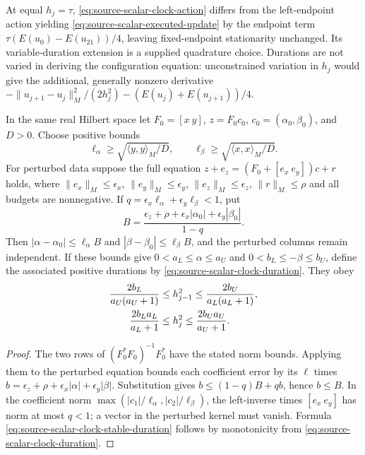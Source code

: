 At equal $h_j=\tau$, \eqref{eq:source-scalar-clock-action} differs from
the left-endpoint action yielding \eqref{eq:source-scalar-executed-update}
by the endpoint term
$\tau(E(u_0)-E(u_{21}))/4$, leaving fixed-endpoint stationarity unchanged.
Its variable-duration extension is a supplied quadrature choice. Durations
are not varied in deriving the configuration equation: unconstrained
variation in $h_j$ would give the additional, generally nonzero derivative
$-\|u_{j+1}-u_j\|_M^2/(2h_j^2)-(E(u_j)+E(u_{j+1}))/4$.

\begin{proposition}
\label{prop:source-scalar-clock-stability}
In the same real Hilbert space let $F_0=[x\ y]$, $z=F_0c_0$,
$c_0=(\alpha_0,\beta_0)$, and $D>0$. Choose positive bounds
\[
 \ell_\alpha\ge\sqrt{\langle y,y\rangle_M/D},\qquad
 \ell_\beta\ge\sqrt{\langle x,x\rangle_M/D}.
\]
For perturbed data suppose the full equation
$z+e_z=(F_0+[e_x\ e_y])c+r$ holds, where
$\|e_x\|_M\le\epsilon_x$, $\|e_y\|_M\le\epsilon_y$,
$\|e_z\|_M\le\epsilon_z$, $\|r\|_M\le\rho$ and all budgets are
nonnegative. If $q=\epsilon_x\ell_\alpha+\epsilon_y\ell_\beta<1$, put
\[
 B=\frac{\epsilon_z+\rho+\epsilon_x|\alpha_0|
                    +\epsilon_y|\beta_0|}{1-q}.
\]
Then $|\alpha-\alpha_0|\le\ell_\alpha B$ and
$|\beta-\beta_0|\le\ell_\beta B$, and the perturbed columns remain
independent. If these bounds give $0<a_L\le\alpha\le a_U$ and
$0<b_L\le-\beta\le b_U$, define the associated positive durations by
\eqref{eq:source-scalar-clock-duration}. They obey
\begin{align}
 \frac{2b_L}{a_U(a_U+1)}&\le h_{j-1}^2
       \le\frac{2b_U}{a_L(a_L+1)},\notag\\
 \frac{2b_La_L}{a_L+1}&\le h_j^2
       \le\frac{2b_Ua_U}{a_U+1}.
 \label{eq:source-scalar-clock-stable-duration}
\end{align}
\end{proposition}
\begin{proof}
The two rows of $(F_0^*F_0)^{-1}F_0^*$ have the stated norm bounds.
Applying them to the perturbed equation bounds each coefficient error by
its $\ell$ times $b=\epsilon_z+\rho+\epsilon_x|\alpha|+
\epsilon_y|\beta|$. Substitution gives $b\le(1-q)B+qb$, hence $b\le B$.
In the coefficient norm $\max(|c_1|/\ell_\alpha,|c_2|/\ell_\beta)$,
the left-inverse times $[e_x\ e_y]$ has norm at most $q<1$; a vector
in the perturbed kernel must vanish. Formula
\eqref{eq:source-scalar-clock-stable-duration} follows by monotonicity
from \eqref{eq:source-scalar-clock-duration}.
\end{proof}

